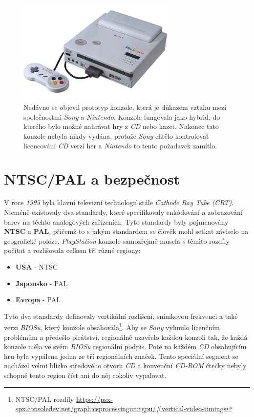 \begin{figure}[hbt]
	\centering
	\includegraphics[width=0.7\textwidth]{obrazky-figures/sony-and-nintendo-console.jpg}
	\caption{Nedávno se objevil prototyp konzole, která je důkazem vztahu mezi společnostmi \textit{Sony} a \textit{Nintendo}. Konzole fungovala jako hybrid, do kterého bylo možné nahrávat hry z \textit{CD} nebo kazet. Nakonec tato konzole nebyla nikdy vydána, protože \textit{Sony} chtělo kontrolovat licencování \textit{CD} verzí her a \textit{Nintendo} to tento požadavek zamítlo\cite{PlayStationNintendo}.}
	\label{sony-and-nintendo-console}
\end{figure}

\section{NTSC/PAL a bezpečnost}

V roce \textit{1995} byla hlavní televizní technologií stále \textit{Cathode Ray Tube (CRT)}. 
Nicméně existovaly dva standardy, které specifikovaly enkódování a zobrazování barev na těchto analogových zařízeních. 
Tyto standardy byly pojmenovány \textbf{NTSC} a \textbf{PAL}, přičemž to s jakým standardem se člověk mohl setkat záviselo na geografické poloze. 
\textit{PlayStation} konzole samozřejmě musela s těmito rozdíly počítat a rozlišovala celkem tři různé regiony:

\begin{itemize}
    \item{\textbf{USA} - NTSC}
    \item{\textbf{Japonsko} - PAL}
    \item{\textbf{Evropa} - PAL}
\end{itemize}

Tyto dva standardy definovaly vertikální rozlišení, 
snímkovou frekvenci a také verzi \textit{BIOSu}, který konzole obsahovala\footnote{NTSC/PAL rozdíly\cite{PSXSpec} \url{https://psx-spx.consoledev.net/graphicsprocessingunitgpu/\#vertical-video-timings}}. 
Aby se \textit{Sony} vyhnulo licenčním problémům a předešlo pirátství, regionálně uzavřelo každou konzoli tak, že každá konzole měla ve svém \textit{BIOSu} regionální podpis. 
Poté na každém \textit{CD} obsahujícím hru byla vypálena jedna ze tří regionálních značek. 
Tento speciální segment se nacházel velmi blízko středového otvoru \textit{CD} a 
konvenční \textit{CD-ROM} čtečky nebyly schopné tento region číst ani do něj cokoliv vypalovat.

